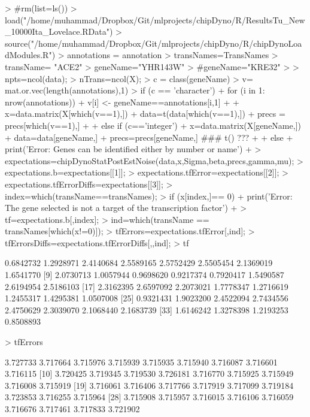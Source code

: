 \documentclass{article}
\begin{document}
\begin{Schunk}
\begin{Sinput}
> #rm(list=ls())
> load("/home/muhammad/Dropbox/Git/mlprojects/chipDyno/R/ResultsTu_New_10000Ita_Lovelace.RData")
> source("/home/muhammad/Dropbox/Git/mlprojects/chipDyno/R/chipDynoLoadModules.R")
> annotations = annotation
> transNames=TransNames
> transName= "ACE2"
> geneName="YHR143W"
> #geneName="KRE32"
> 
> npts=ncol(data);
> nTrans=ncol(X);
> c = class(geneName)
> v= mat.or.vec(length(annotations),1)
> if (c == 'character'){
+   for (i in 1: nrow(annotations)) { 
+ 		v[i] <- geneName==annotations[i,1]
+ 		}
+ 	x=data.matrix(X[which(v==1),])
+ 	data=t(data[which(v==1),])
+ 	precs = precs[which(v==1),]
+ 
+ } else if (c=='integer'){
+ 	x=data.matrix(X[geneName,])
+ 	data=data[geneName,]
+ 	precs=precs[geneName,] ### t() ???
+ 
+ } else {
+ 	print('Error: Genes can be identified either by number or name')
+ }
> expectations=chipDynoStatPostEstNoise(data,x,Sigma,beta,precs,gamma,mu);
> expectations.b=expectations[[1]];
> expectations.tfError=expectations[[2]];
> expectations.tfErrorDiffs=expectations[[3]];
> index=which(transName==transNames);
> if (x[index,]== 0) {
+  print('Error: The gene selected is not a target of the transcription factor')
+ }
> tf=expectations.b[,index];
> ind=which(transName == transNames[which(x!=0)]);
> tfErrors=expectations.tfError[,ind];
> tfErrorsDiffs=expectations.tfErrorDiffs[,,ind];
> tf
\end{Sinput}
\begin{Soutput}
 [1] 0.6842732 1.2928971 2.4140684 2.5589165 2.5752429 2.5505454 2.1369019 1.6541770
 [9] 2.0730713 1.0057944 0.9698620 0.9217374 0.7920417 1.5490587 2.6194954 2.5186103
[17] 2.3162395 2.6597092 2.2073021 1.7778347 1.2716619 1.2455317 1.4295381 1.0507008
[25] 0.9321431 1.9023200 2.4522094 2.7434556 2.4750629 2.3039070 2.1068440 2.1683739
[33] 1.6146242 1.3278398 1.2193253 0.8508893
\end{Soutput}
\begin{Sinput}
> tfErrors
\end{Sinput}
\begin{Soutput}
 [1] 3.727733 3.717664 3.715976 3.715939 3.715935 3.715940 3.716087 3.716601 3.716115
[10] 3.720425 3.719345 3.719530 3.726181 3.716770 3.715925 3.715949 3.716008 3.715919
[19] 3.716061 3.716406 3.717766 3.717919 3.717099 3.719184 3.723853 3.716255 3.715964
[28] 3.715908 3.715957 3.716015 3.716106 3.716059 3.716676 3.717461 3.717833 3.721902
\end{Soutput}
\end{Schunk}
\end{document}

